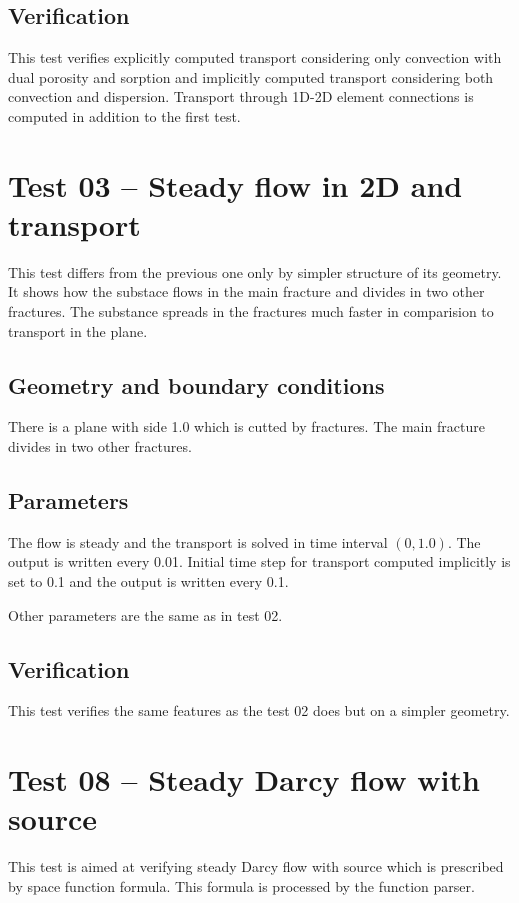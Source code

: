 \subsection*{Verification}
This test verifies explicitly computed transport considering only convection with dual porosity and sorption and implicitly computed transport considering both convection and dispersion. Transport through 1D-2D element connections is computed in addition to the first test.




\section{Test 03 -- Steady flow in 2D and transport}
\label{sec:test03}
This test differs from the previous one only by simpler structure of its geometry. It shows how the substace flows in the main fracture and divides in two other fractures. The substance spreads in the fractures much faster in comparision to transport in the plane.
\subsection*{Geometry and boundary conditions}
There is a plane with side 1.0 which is cutted by fractures. The main fracture divides in two other fractures.
\subsection*{Parameters}
The flow is steady and the transport is solved in time interval $(0,1.0)$. The output is written every 0.01. Initial time step for transport computed implicitly is set to 0.1 and the output is written every 0.1.

Other parameters are the same as in test 02.
\subsection*{Verification}
This test verifies the same features as the test 02 does but on a simpler geometry.




\section{Test 08 -- Steady Darcy flow with source}
\label{sec:test08}
This test is aimed at verifying steady Darcy flow with source which is prescribed by space function formula. This formula is processed by the function parser.

